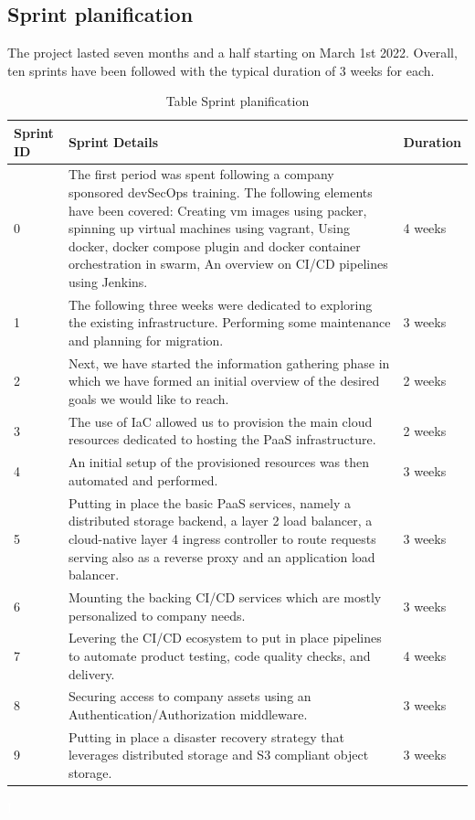 \newpage
\subsection{Sprint planification }
The project lasted seven months and a half starting on March 1st 2022. Overall, ten sprints have been followed with the typical duration of 3 weeks for each. 


\begin{table}[h!]
\center
\begin{tabular}[b]{|m{2cm}|m{9cm}|m{2cm}|}
\hline
 {\textbf{Sprint ID}} & {\textbf{Sprint Details }} & {\textbf{Duration }} \\ \hline 
0 
&
The first period was spent following a company sponsored devSecOps training. The following elements have been covered: 
Creating vm images using packer, spinning up virtual machines using vagrant,  
Using docker, docker compose plugin and docker container orchestration in swarm, 
An overview on CI/CD pipelines using Jenkins. 
&
4 weeks  \\
\hline
1 
&
The following three weeks were dedicated to exploring the existing infrastructure. Performing some maintenance and planning for migration. 
&
3 weeks  \\ \hline
2 
&
Next, we have started the information gathering phase in which we have formed an initial overview of the desired goals we would like to reach. 
&
2 weeks \\ \hline
3 
&
The use of IaC allowed us to provision the main cloud resources dedicated to hosting the PaaS infrastructure. 
&
2 weeks \\ \hline
4 
&
An initial setup of the provisioned resources was then automated and performed. 
&
3 weeks \\ \hline
5 
&
Putting in place the basic PaaS services, namely a distributed storage backend, a layer 2 load balancer, a cloud-native layer 4 ingress controller to route requests serving also as a reverse proxy and an application load balancer. 
&
3 weeks \\ \hline
6 
&
Mounting the backing CI/CD services which are mostly personalized to company needs. 
&
3 weeks \\ \hline
7 
&
Levering the CI/CD ecosystem to put in place pipelines to automate product testing, code quality checks, and delivery. 
&
4 weeks \\ \hline
8 
&
Securing access to company assets using an Authentication/Authorization middleware. 
&
3 weeks \\ \hline
9 
&
Putting in place a disaster recovery strategy that leverages distributed storage and S3 compliant object storage. 
&
3 weeks \\ \hline
\end{tabular}
\caption{Table Sprint planification}
\textcolor{white}{I} \label{tab:tab-m}
\end{table}

